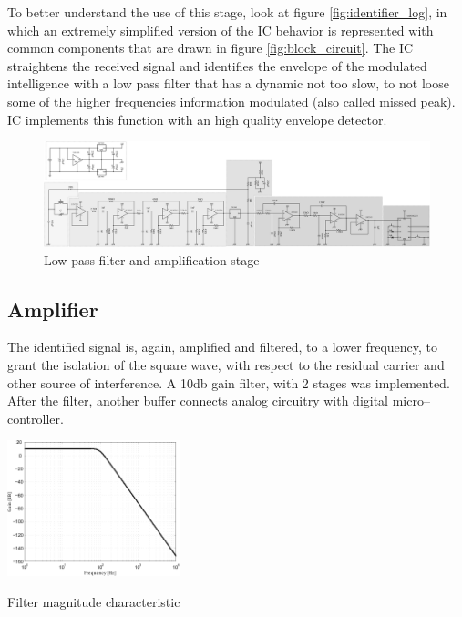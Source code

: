 To better understand the use of this stage, look at figure \ref{fig:identifier_log}, in which an extremely simplified version of the IC behavior is represented with common components that are drawn in figure \ref{fig:block_circuit}. The IC straightens the received signal and identifies the envelope of the modulated intelligence with a low pass filter that has a dynamic not too slow, to not loose some of the higher frequencies information modulated (also called missed peak). IC implements this function with an high quality envelope detector.
\begin{figure}[h]
	\centering
	\includegraphics*[viewport=1443 3 2320 350,scale=0.4]{ch2/img/receiver3.pdf}
	\caption{Low pass filter and amplification stage}
	\label{fig:filter2}
	\forceversofloat
\end{figure}

\subsection{Amplifier}

The identified signal is, again, amplified and filtered, to a lower frequency, to grant the isolation of the square wave, with respect to the residual carrier and other source of interference. A \num{10}\si{\decibel} gain filter, with 2 stages was implemented. After the filter, another buffer connects analog circuitry with digital micro--controller.
\begin{marginfigure}
	\centering
	\includegraphics[width=5cm]{ch2/img/filter2.pdf}
	\caption{Filter magnitude characteristic}
\end{marginfigure}

